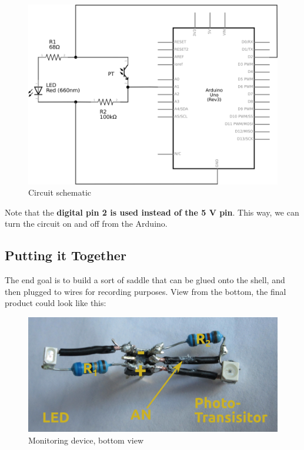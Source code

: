 \documentclass[]{article}
\begin{document}
\begin{figure}[htbp]
\centering
\includegraphics{./img/circuit.png}
\caption{Circuit schematic}
\end{figure}

Note that the \textbf{digital pin 2 is used instead of the 5 V pin}.
This way, we can turn the circuit on and off from the Arduino.

\subsection{Putting it Together}\label{putting-it-together}

The end goal is to build a sort of saddle that can be glued onto the
shell, and then plugged to wires for recording purposes. View from the
bottom, the final product could look like this:

\begin{figure}[htbp]
\centering
\includegraphics{./img/fig1.jpg}
\caption{Monitoring device, bottom view}
\end{figure}
\end{document}
